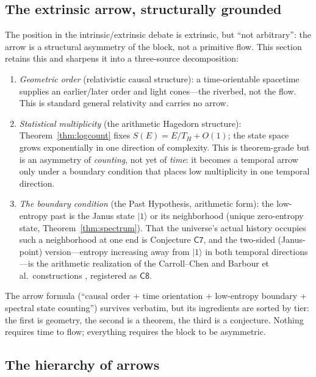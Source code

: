 \documentclass[11pt,a4paper]{article}
\theoremstyle{plain}
\theoremstyle{definition}
\theoremstyle{remark}
\newcommand{\ket}[1]{\lvert #1\rangle}
\begin{document}
\subsection{The extrinsic arrow, structurally grounded}

The position in the intrinsic/extrinsic debate is extrinsic, but ``not
arbitrary'': the arrow is a structural asymmetry of the block, not a primitive flow. This
section retains this and sharpens it into a three-source decomposition:

\begin{enumerate}[leftmargin=1.6em]
\item \emph{Geometric order} (relativistic causal structure): a time-orientable spacetime
supplies an earlier/later order and light cones---the riverbed, not the flow. This is
standard general relativity and carries no arrow.
\item \emph{Statistical multiplicity} (the arithmetic Hagedorn structure):
Theorem~\ref{thm:logcount} fixes $S(E)=E/T_{H}+O(1)$; the state space grows exponentially
in one direction of complexity. This is theorem-grade but is an asymmetry of
\emph{counting}, not yet of \emph{time}: it becomes a temporal arrow only under a boundary
condition that places low multiplicity in one temporal direction.
\item \emph{The boundary condition} (the Past Hypothesis, arithmetic form): the low-entropy
past is the Janus state $\ket{1}$ or its neighborhood (unique zero-entropy state,
Theorem~\ref{thm:spectrum}). That the universe's actual history occupies such a neighborhood
at one end is Conjecture $\mathsf{C7}$, and the two-sided (Janus-point) version---entropy
increasing away from $\ket{1}$ in both temporal directions---is the arithmetic realization
of the Carroll--Chen and Barbour et al.\ constructions
\cite{carrollchen2005,barbour2016,barbour2014}, registered as $\mathsf{C8}$.
\end{enumerate}

The arrow formula (``causal order + time orientation + low-entropy boundary +
spectral state counting'') survives verbatim, but its ingredients are sorted by tier:
the first is geometry, the second is a theorem, the third is a conjecture. Nothing
requires time to flow; everything requires the block to be asymmetric.

\subsection{The hierarchy of arrows}
\end{document}
